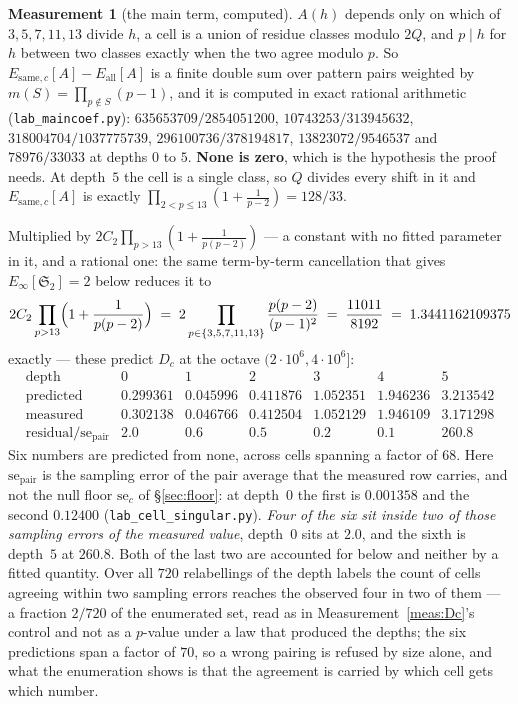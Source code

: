 \documentclass[11pt,a4paper]{article}
\theoremstyle{plain}
\theoremstyle{definition}
\newtheorem{measurement}[theorem]{Measurement}
\theoremstyle{remark}
\renewcommand{\SS}{\mathfrak{S}}
\begin{document}
\begin{measurement}[the main term, computed]\label{meas:maincoef}
$A(h)$ depends only on which of $3,5,7,11,13$ divide $h$, a cell is a
union of residue classes modulo $2Q$, and $p\mid h$ for $h$ between two
classes exactly when the two agree modulo $p$. So
$E_{\mathrm{same},c}[A]-E_{\mathrm{all}}[A]$ is a finite double sum
over pattern pairs weighted by $m(S)=\prod_{p\notin S}(p-1)$, and it is
computed in exact rational arithmetic
(\texttt{lab\_maincoef.py}): $635653709/2854051200$,
$10743253/313945632$, $318004704/1037775739$, $296100736/378194817$,
$13823072/9546537$ and $78976/33033$ at depths $0$ to $5$. \textbf{None
is zero}, which is the hypothesis the proof needs. At depth~$5$ the
cell is a single class, so $Q$ divides every shift in it and
$E_{\mathrm{same},c}[A]$ is exactly
$\prod_{2<p\le13}(1+\frac1{p-2})=128/33$.

Multiplied by $2C_2\prod_{p>13}(1+\frac1{p(p-2)})$ --- a constant with
no fitted parameter in it, and a rational one: the same
term-by-term cancellation that gives $E_\infty[\SS_2]=2$ below reduces
it to
\[
  2C_2\prod_{p>13}\Bigl(1+\frac1{p(p-2)}\Bigr)
  \;=\;2\prod_{p\in\{3,5,7,11,13\}}\frac{p(p-2)}{(p-1)^2}
  \;=\;\frac{11011}{8192}\;=\;1.3441162109375
\]
exactly --- these predict $D_c$ at the octave
$(2\cdot10^6,4\cdot10^6]$:
\[
\begin{array}{r|cccccc}
 \text{depth} & 0 & 1 & 2 & 3 & 4 & 5\\\hline
 \text{predicted} & 0.299361 & 0.045996 & 0.411876 & 1.052351
   & 1.946236 & 3.213542\\
 \text{measured} & 0.302138 & 0.046766 & 0.412504 & 1.052129
   & 1.946109 & 3.171298\\
 \text{residual}/\mathrm{se}_{\mathrm{pair}} & 2.0 & 0.6 & 0.5 & 0.2 & 0.1 & 260.8
\end{array}
\]
Six numbers are predicted from none, across cells spanning a factor of
$68$. Here $\mathrm{se}_{\mathrm{pair}}$ is the sampling error of the
pair average that the measured row carries, and not the null floor
$\mathrm{se}_c$ of \S\ref{sec:floor}: at depth~$0$ the first is
$0.001358$ and the second $0.12400$
(\texttt{lab\_cell\_singular.py}). \emph{Four of the six sit inside two of those sampling
errors of the measured value}, depth~$0$ sits at $2.0$, and the sixth
is depth~$5$ at
$260.8$. Both of the last two are accounted for below and neither by a
fitted quantity. Over all $720$ relabellings of the depth
labels the count of cells agreeing within two sampling errors reaches
the observed four in two of them --- a fraction $2/720$ of the
enumerated set, read as in Measurement~\ref{meas:Dc}'s control and not
as a $p$-value under a law that produced the depths; the six
predictions span a factor
of $70$, so a wrong pairing is refused by size alone, and what the
enumeration shows is that the agreement is carried by which cell gets
which number.


\end{measurement}
\end{document}
